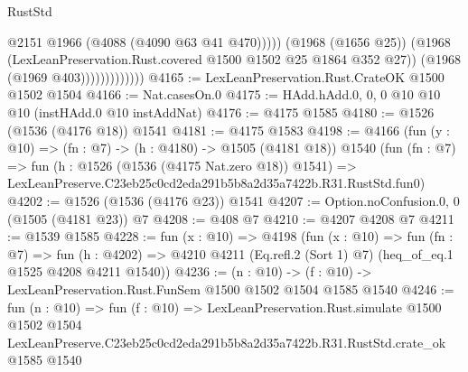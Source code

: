 \begin{lexlean}{RustStd}
\begin{coremodule}
                                @2151
                                @1966
                                (@4088 (@4090 @63 @41 @470)))))
                          (@1968 (@1656 @25))
                          (@1968 (LexLeanPreservation.Rust.covered @1500 @1502 @25 @1864 @352 @27))
                          (@1968 (@1969 @403)))))))))))))
@4165 := LexLeanPreservation.Rust.CrateOK @1500 @1502 @1504
@4166 := Nat.casesOn.{0}
@4175 := HAdd.hAdd.{0, 0, 0} @10 @10 @10 (instHAdd.{0} @10 instAddNat)
@4176 := @4175 @1585
@4180 := @1526 (@1536 (@4176 @18)) @1541
@4181 := @4175 @1583
@4198 := @4166
    (fun (y : @10) => (fn : @7) -> (h : @4180) -> @1505 (@4181 @18))
    @1540
    (fun (fn : @7) =>
    fun (h : @1526 (@1536 (@4175 Nat.zero @18)) @1541) =>
    LexLeanPreserve.C23eb25c0cd2eda291b5b8a2d35a7422b.R31.RustStd.fun0)
@4202 := @1526 (@1536 (@4176 @23)) @1541
@4207 := Option.noConfusion.{0, 0} (@1505 (@4181 @23)) @7
@4208 := @408 @7
@4210 := @4207 @4208 @7
@4211 := @1539 @1585
@4228 := fun (x : @10) =>
  @4198
    (fun (x : @10) =>
    fun (fn : @7) =>
    fun (h : @4202) =>
    @4210 @4211 (Eq.refl.{2} (Sort 1) @7) (heq_of_eq.{1} @1525 @4208 @4211 @1540))
@4236 := (n : @10) -> (f : @10) -> LexLeanPreservation.Rust.FunSem @1500 @1502 @1504 @1585 @1540
@4246 := fun (n : @10) =>
  fun (f : @10) =>
  LexLeanPreservation.Rust.simulate
    @1500
    @1502
    @1504
    LexLeanPreserve.C23eb25c0cd2eda291b5b8a2d35a7422b.R31.RustStd.crate_ok
    @1585
    @1540
\end{coremodule}
\end{lexlean}
